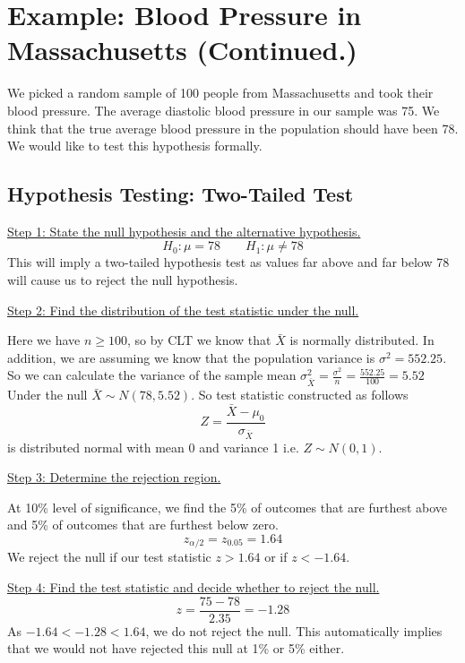 \documentclass{./../../Latex/handout}
\begin{document}
\thispagestyle{plain}

\vspace{-1cm}
\section*{Example: Blood Pressure in Massachusetts (Continued.)}

We picked a random sample of 100 people from Massachusetts and took their blood pressure. The average diastolic blood pressure in our sample was 75. We think that the true average blood pressure in the population should have been 78. We would like to test this hypothesis formally. 

\subsection*{Hypothesis Testing: Two-Tailed Test} 

\underline{Step 1: State the null hypothesis and the alternative hypothesis.}
$$ H_0: \mu = 78 \quad \quad H_1: \mu \neq 78 $$
This will imply a two-tailed hypothesis test as values far above and far below 78 will cause us to reject the null hypothesis. 

\underline{Step 2:  Find the distribution of the test statistic under the null.} 

Here we have $n \geq 100$, so by CLT we know that $ \bar{X}$ is normally distributed. In addition, we are assuming we know that the population variance is $\sigma^2 = 552.25$. So we can calculate the variance of the sample mean $ \sigma^2_{\bar{X}} = \frac{\sigma^2}{n}= \frac{552.25}{100} = 5.52$ Under the null $ \bar{X} \sim N(78, 5.52) $. So test statistic constructed as follows
$$ Z = \frac{\bar{X}-\mu_0}{\sigma_{\bar{X}}} $$ 
is distributed normal with mean 0 and variance 1 i.e. $Z \sim N(0,1)$. 

\underline{Step 3: Determine the rejection region.}   

At 10\% level of significance, we find the 5\% of outcomes that are furthest above and 5\% of outcomes that are furthest below zero. 
$$ z_{\alpha/2} = z_{0.05} = 1.64 $$
We reject the null if our test statistic $z>1.64$ or if $z<-1.64$. 

\underline{Step 4: Find the test statistic and decide whether to reject the null.} \\
$$ z = \frac{75-78}{2.35} = -1.28 $$ 
As $-1.64 < -1.28 < 1.64$, we do not reject the null. This automatically implies that we would not have rejected this null at 1\% or 5\% either. 
\end{document}
